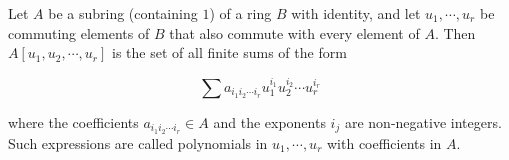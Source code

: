 Let $A$ be a subring (containing $1$) of a ring $B$ with identity, and let $u_1, \cdots, u_r$ be commuting elements of $B$ that also commute with every element of $A$. Then $A[u_1, u_2, \cdots, u_r]$ is the set of all finite sums of the form

$$\sum a_{i_1 i_2 \cdots i_r} u_1^{i_1} u_2^{i_2} \cdots u_r^{i_r}$$

where the coefficients $a_{i_1 i_2 \cdots i_r} \in A$ and the exponents $i_j$ are non-negative integers. Such expressions are called polynomials in $u_1, \cdots, u_r$ with coefficients in $A$.
